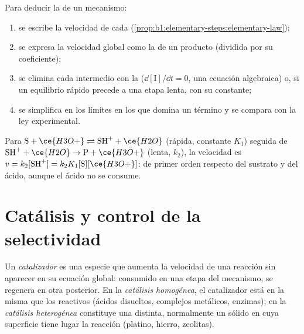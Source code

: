 \begin{method}\label{met:b1:elementary-steps:rate-law}
Para deducir la  de un mecanismo:
\begin{enumerate}
  \item se escribe la velocidad de cada  (\cref{prop:b1:elementary-steps:elementary-law});
  \item se expresa la velocidad global como la  de
        un producto (dividida por su coeficiente);
  \item se elimina cada intermedio con la  ($\dd[\mathrm{I}]/\dd t = 0$, una ecuación algebraica)
        o, si un equilibrio rápido precede a una etapa lenta, con su
        constante;
  \item se simplifica en los límites en los que domina un término y se
        compara con la ley experimental.
\end{enumerate}
\end{method}

\begin{example}\label{ex:b1:elementary-steps:acid}
Para $\mathrm{S} + \ce{H3O+} \rightleftharpoons \mathrm{SH}^+ + \ce{H2O}$
(rápida, constante $K_1$) seguida de $\mathrm{SH}^+ + \ce{H2O} \to \mathrm{P} + \ce{H3O+}$
(lenta, $k_2$), la velocidad es $v = k_2[\mathrm{SH}^+] = k_2K_1[\mathrm{S}][\ce{H3O+}]$:
de primer orden respecto del sustrato y del ácido, aunque el ácido no se
consume.
\end{example}

\section{Catálisis y control de la selectividad}

\begin{definition}\label{def:b1:elementary-steps:catalyst}
Un \emph{catalizador} es una especie que aumenta la
velocidad de una reacción sin aparecer en su ecuación global: consumido
en una etapa del mecanismo, se regenera en otra posterior. En la
\emph{catálisis homogénea}, el catalizador está en
la misma  que los reactivos (ácidos disueltos, complejos metálicos,
enzimas); en la \emph{catálisis heterogénea}
constituye una  distinta, normalmente un sólido en cuya superficie
tiene lugar la reacción (platino, hierro, zeolitas).
\end{definition}

